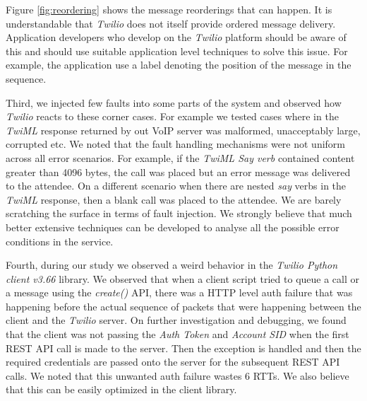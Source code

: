 Figure {\ref{fig:reordering}} shows the message reorderings that can happen. It is understandable that \textit{Twilio} does not itself provide ordered message delivery. Application developers who develop on the \textit{Twilio} platform should be aware of this and should use suitable application level techniques to solve this issue. For example, the application use a label denoting the position of the message in the sequence. 

Third, we injected few faults into some parts of the system and observed how \textit{Twilio} reacts to these corner cases. For example we tested cases where in the \textit{TwiML} response returned by out VoIP server was malformed, unacceptably large, corrupted etc. We noted that the fault handling mechanisms were not uniform across all error scenarios. For example, if the \textit{TwiML Say verb} contained content greater than 4096 bytes, the call was placed but an error message was delivered to the attendee. On a different scenario when there are nested \textit{say} verbs in the \textit{TwiML} response, then a blank call was placed to the attendee. We are barely scratching the surface in terms of fault injection. We strongly believe that much better extensive techniques can be developed to analyse all the possible error conditions in the service.  

Fourth, during our study we observed a weird behavior in the \textit{Twilio Python client v3.66} library. We observed that when a client script tried to queue a call or a message using the \textit{create()} API, there was a HTTP level auth failure that was happening before the actual sequence of packets that were happening between the client and the \textit{Twilio} server. On further investigation and debugging, we found that the client was not passing the \textit{Auth Token} and \textit{Account SID} when the first REST API call is made to the server. Then the exception is handled and then the required credentials are passed onto the server for the subsequent REST API calls. We noted that this unwanted auth failure wastes 6 RTTs. We also believe that this can be easily optimized in the client library. 

